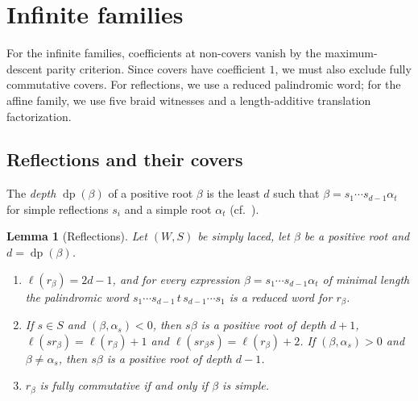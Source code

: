\documentclass[10pt]{article}
\newtheorem{lemma}[theorem]{Lemma}
\theoremstyle{remark}
\newcommand{\dpth}{\operatorname{dp}}
\begin{document}
\section{Infinite families}\label{sec:families}

For the infinite families, coefficients at non-covers vanish by the
maximum-descent parity criterion. Since covers have coefficient $1$, we
must also exclude fully commutative covers. For reflections, we use a
reduced palindromic word; for the affine family, we use five braid
witnesses and a length-additive translation factorization.

\subsection{Reflections and their covers}\label{sec:covers}
The \emph{depth} $\dpth(\beta)$ of a positive root $\beta$ is the least $d$
such that $\beta=s_1\cdots s_{d-1}\alpha_t$ for simple reflections $s_i$
and a simple root $\alpha_t$ (cf.\ \cite[\S4.6]{BB}).
\begin{lemma}[Reflections]\label{lem:reflections}
Let $(W,S)$ be simply laced, let $\beta$ be a positive root and
$d=\dpth(\beta)$.
\begin{enumerate}
\item[(i)] $\ell(r_\beta)=2d-1$, and for every expression
$\beta=s_1\cdots s_{d-1}\alpha_t$ of minimal length the palindromic word
$s_1\cdots s_{d-1}\,t\,s_{d-1}\cdots s_1$ is a reduced word for $r_\beta$.
\item[(ii)] If $s\in S$ and $(\beta,\alpha_s)<0$, then $s\beta$ is a
positive root of depth $d+1$, $\ell(sr_\beta)=\ell(r_\beta)+1$ and
$\ell(sr_\beta s)=\ell(r_\beta)+2$. If $(\beta,\alpha_s)>0$ and
$\beta\neq\alpha_s$, then $s\beta$ is a positive root of depth $d-1$.
\item[(iii)] $r_\beta$ is fully commutative if and only if $\beta$ is
simple.
\end{enumerate}
\end{lemma}
\end{document}
